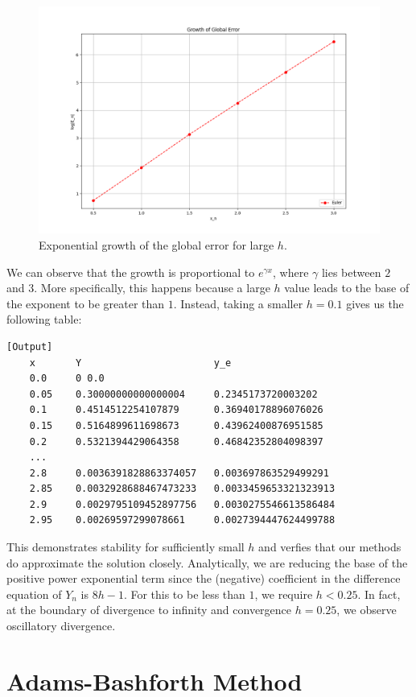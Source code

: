 \documentclass{article}
\begin{document}
\begin{figure}
    \centering
    \includegraphics[width=1.0\textwidth]{images/global_error.png}
    \caption{Exponential growth of the global error for large \(h\).}
\end{figure}


We can observe that the growth is proportional to \(e^{\gamma x}\), where \(\gamma\) lies between \(2\) and \(3\). More specifically, this happens because a large \(h\) value leads to the base of the exponent to be greater than \(1\). Instead, taking a smaller \(h = 0.1\) gives us the following table:
\begin{verbatim}[Output]
    x       Y                       y_e
    0.0     0 0.0
    0.05    0.30000000000000004     0.2345173720003202
    0.1     0.4514512254107879      0.36940178896076026
    0.15    0.5164899611698673      0.43962400876951585
    0.2     0.5321394429064358      0.46842352804098397
    ...
    2.8     0.0036391828863374057   0.003697863529499291
    2.85    0.0032928688467473233   0.0033459653321323913
    2.9     0.0029795109452897756   0.0030275546613586484
    2.95    0.00269597299078661     0.0027394447624499788
\end{verbatim}
This demonstrates stability for sufficiently small \(h\) and verfies that our methods do approximate the solution closely. Analytically, we are reducing the base of the positive power exponential term since the (negative) coefficient in the difference equation of \(Y_n\) is \(8h - 1\). For this to be less than \(1\), we require \(h < 0.25\). In fact, at the boundary of divergence to infinity and convergence \(h = 0.25\), we observe oscillatory divergence.

\section{Adams-Bashforth Method}
\end{document}
